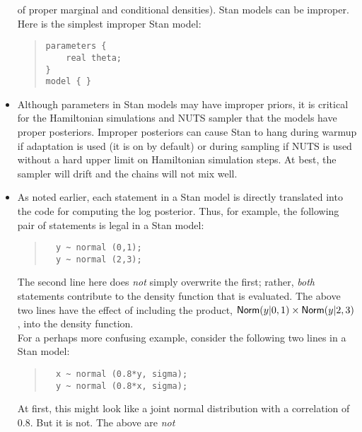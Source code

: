 \begin{itemize}
  of proper marginal and conditional densities).  Stan models can be
  improper.  Here is the simplest improper Stan model: 
\begin{quote}
\begin{Verbatim}
parameters {
    real theta;
} 
model { }
\end{Verbatim}
\end{quote}
\item Although parameters in Stan models may have improper priors, it
  is critical for the Hamiltonian simulations and NUTS sampler that
  the models have proper posteriors.  Improper posteriors can cause
  Stan to hang during warmup if adaptation is used (it is on by
  default) or during sampling if NUTS is used without a hard upper
  limit on Hamiltonian simulation steps.  At best, the sampler will
  drift and the chains will not mix well.  
\item
  As noted earlier, each statement in a Stan model is directly translated into the \Cpp code for computing the log posterior.  Thus, for example, the following pair of statements is legal in a Stan model:
\begin{quote}
\begin{Verbatim}
  y ~ normal (0,1);
  y ~ normal (2,3);
\end{Verbatim}
\end{quote}
%
The second line here does \emph{not} simply overwrite the first;
rather, \emph{both} statements contribute to the density function that
is evaluated.  The above two lines have the effect of including the
product, $\mbox{\sf Norm}(y|0,1) \times \mbox{\sf Norm}(y|2,3)$, into the
density function.
\\[6pt] 
For a perhaps more confusing example, consider the following two lines in a Stan model:
\begin{quote}
\begin{Verbatim}
  x ~ normal (0.8*y, sigma);
  y ~ normal (0.8*x, sigma);
\end{Verbatim}
\end{quote}
%
At first, this might look like a joint normal distribution with a
correlation of 0.8.  But it is not.  The above are \emph{not}

\end{itemize}
